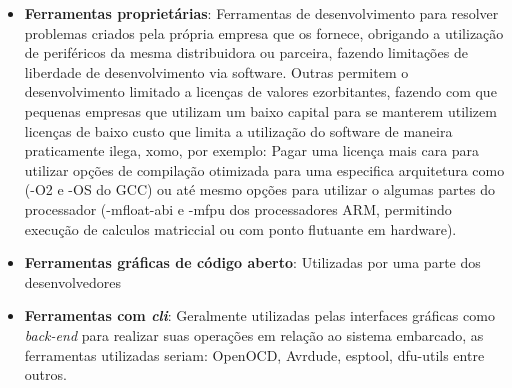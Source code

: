 \begin{itemize}
 \item \textbf{Ferramentas proprietárias}: Ferramentas de desenvolvimento para resolver problemas criados pela própria empresa que os fornece,
 obrigando a utilização de periféricos da mesma distribuidora ou parceira, fazendo limitações de liberdade de desenvolvimento via
 software. Outras permitem o desenvolvimento limitado a licenças de valores ezorbitantes, fazendo com que pequenas empresas que utilizam
 um baixo capital para se manterem utilizem licenças de baixo custo que limita a utilização do software de maneira praticamente
 ilega, xomo, por exemplo: Pagar uma licença mais cara para utilizar opções de compilação otimizada para uma especifica arquitetura
 como (-O2 e -OS do GCC) ou até mesmo opções para utilizar o algumas partes do processador (-mfloat-abi e -mfpu dos processadores ARM,
 permitindo execução de calculos matriccial ou com ponto flutuante em hardware).
 \item \textbf{Ferramentas gráficas de código aberto}: Utilizadas por uma parte dos desenvolvedores
 \item \textbf{Ferramentas com \textit{cli}}: Geralmente utilizadas pelas interfaces gráficas como \textit{back-end} para realizar suas
 operações em relação ao sistema embarcado, as ferramentas utilizadas seriam: OpenOCD, Avrdude, esptool, dfu-utils entre outros.
\end{itemize}



